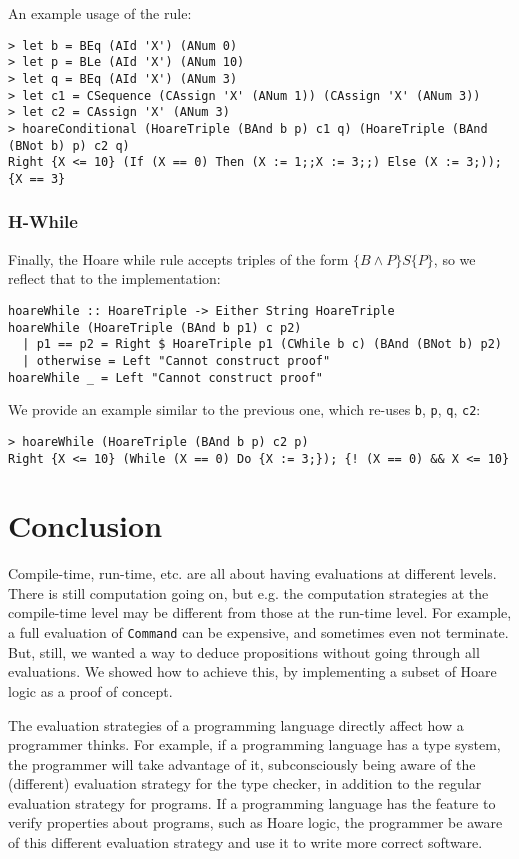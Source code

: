 \documentclass{article}
\theoremstyle{definition}
\begin{document}
An example usage of the rule:

\begin{lstlisting}
> let b = BEq (AId 'X') (ANum 0)
> let p = BLe (AId 'X') (ANum 10)
> let q = BEq (AId 'X') (ANum 3)
> let c1 = CSequence (CAssign 'X' (ANum 1)) (CAssign 'X' (ANum 3))
> let c2 = CAssign 'X' (ANum 3)
> hoareConditional (HoareTriple (BAnd b p) c1 q) (HoareTriple (BAnd (BNot b) p) c2 q)
Right {X <= 10} (If (X == 0) Then (X := 1;;X := 3;;) Else (X := 3;)); {X == 3}
\end{lstlisting}

\subsubsection{H-While}

Finally, the Hoare while rule accepts triples of the form $\{B \land P\} S \{ P \}$, so we reflect that to the implementation:

\begin{lstlisting}
hoareWhile :: HoareTriple -> Either String HoareTriple
hoareWhile (HoareTriple (BAnd b p1) c p2)
  | p1 == p2 = Right $ HoareTriple p1 (CWhile b c) (BAnd (BNot b) p2)
  | otherwise = Left "Cannot construct proof"
hoareWhile _ = Left "Cannot construct proof"
\end{lstlisting}

We provide an example similar to the previous one, which re-uses \texttt{b}, \texttt{p}, \texttt{q}, \texttt{c2}:

\begin{lstlisting}
> hoareWhile (HoareTriple (BAnd b p) c2 p)
Right {X <= 10} (While (X == 0) Do {X := 3;}); {! (X == 0) && X <= 10}
\end{lstlisting}

\section{Conclusion}
Compile-time, run-time, etc. are all about having evaluations at different levels. There is still computation going on, but e.g. the computation strategies at the compile-time level may be different from those at the run-time level. For example, a full evaluation of \texttt{Command} can be expensive, and sometimes even not terminate. But, still, we wanted a way to deduce propositions without going through all evaluations. We showed how to achieve this, by implementing a subset of Hoare logic as a proof of concept.

The evaluation strategies of a programming language directly affect how a programmer thinks. For example, if a programming language has a type system, the programmer will take advantage of it, subconsciously being aware of the (different) evaluation strategy for the type checker, in addition to the regular evaluation strategy for programs. If a programming language has the feature to verify properties about programs, such as Hoare logic, the programmer be aware of this different evaluation strategy and use it to write more correct software.
\end{document}
